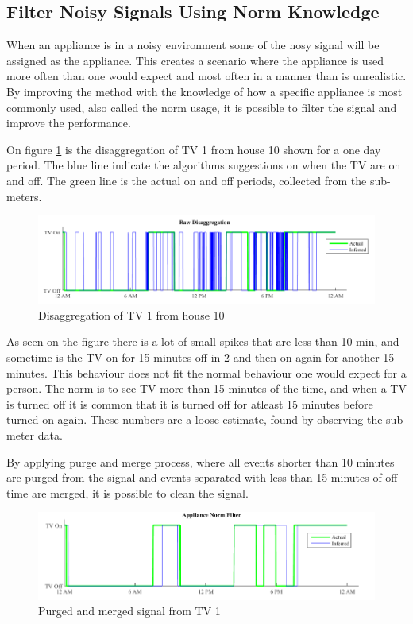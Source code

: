 \subsection{Filter Noisy Signals Using Norm Knowledge }
\label{sec:NormFilter}
When an appliance is in a noisy environment some of the nosy signal will be assigned as the appliance. This creates a scenario where the appliance is used more often than one would expect and most often in a manner than is unrealistic. By improving the method with the knowledge of how a specific appliance is most commonly used, also called the norm usage, it is possible to filter the signal and improve the performance. 

On figure \ref{fig:Norm1} is the disaggregation of TV 1 from house 10 shown for a one day period. The blue line indicate the  algorithms suggestions on when the TV are on and off. The green line is the actual on and off periods, collected from the sub-meters. 

\begin{figure}[H]
\centering
\includegraphics[width=1\textwidth]{billeder/AppNormFilterH10_1.png}
\caption{Disaggregation of TV 1 from house 10}
\label{fig:Norm1}
\end{figure}

As seen on the figure there is a lot of small spikes that are less than 10 min, and sometime is the TV on for 15 minutes off in 2 and then on again for another 15 minutes. This behaviour does not fit the normal behaviour one would expect for a person. The norm is to see TV more than 15 minutes of the time, and when a TV is turned off it is common that it is turned off for atleast 15 minutes before turned on again. These numbers are a loose estimate, found by observing the sub-meter data. 

By applying purge and merge process, where all events shorter than 10 minutes are purged from the signal and events separated with less than 15 minutes of off time are merged, it is possible to clean the signal. 

\begin{figure}[H]
\centering
\includegraphics[width=1\textwidth]{billeder/AppNormFilterH10_2.png}
\caption{Purged and merged signal from TV 1}
\label{fig:Norm2}
\end{figure}

